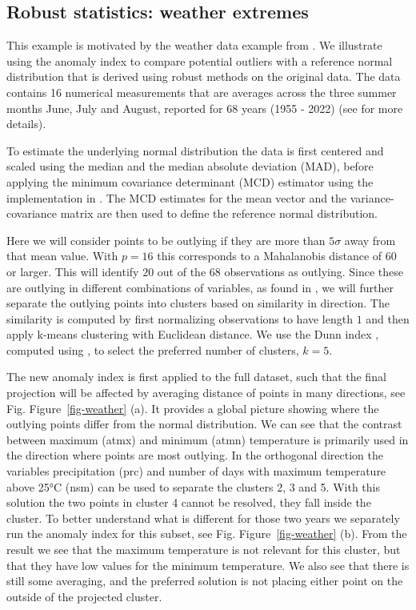 \documentclass[
  12pt]{article}
\begin{document}
\subsection{Robust statistics: weather
extremes}\label{robust-statistics-weather-extremes}

This example is motivated by the weather data example from
\citet{filzmoser2018}. We illustrate using the anomaly index to compare
potential outliers with a reference normal distribution that is derived
using robust methods on the original data. The data contains 16
numerical measurements that are averages across the three summer months
June, July and August, reported for 68 years (1955 - 2022) (see
\citet{filzmoser2018} for more details).

To estimate the underlying normal distribution the data is first
centered and scaled using the median and the median absolute deviation
(MAD), before applying the minimum covariance determinant (MCD)
estimator \citep{rousseeuw1985multivariate} using the implementation in
\citet{robustbase}. The MCD estimates for the mean vector and the
variance-covariance matrix are then used to define the reference normal
distribution.

Here we will consider points to be outlying if they are more than
\(5 \sigma\) away from that mean value. With \(p=16\) this corresponds
to a Mahalanobis distance of \(60\) or larger. This will identify \(20\)
out of the \(68\) observations as outlying. Since these are outlying in
different combinations of variables, as found in \citet{filzmoser2018},
we will further separate the outlying points into clusters based on
similarity in direction. The similarity is computed by first normalizing
observations to have length \(1\) and then apply k-means clustering with
Euclidean distance. We use the Dunn index \citet{dunn}, computed using
\citet{fpc}, to select the preferred number of clusters, \(k=5\).

The new anomaly index is first applied to the full dataset, such that
the final projection will be affected by averaging distance of points in
many directions, see Fig. Figure~\ref{fig-weather} (a). It provides a
global picture showing where the outlying points differ from the normal
distribution. We can see that the contrast between maximum (atmx) and
minimum (atmn) temperature is primarily used in the direction where
points are most outlying. In the orthogonal direction the variables
precipitation (prc) and number of days with maximum temperature above
25°C (nsm) can be used to separate the clusters 2, 3 and 5. With this
solution the two points in cluster 4 cannot be resolved, they fall
inside the cluster. To better understand what is different for those two
years we separately run the anomaly index for this subset, see Fig.
Figure~\ref{fig-weather} (b). From the result we see that the maximum
temperature is not relevant for this cluster, but that they have low
values for the minimum temperature. We also see that there is still some
averaging, and the preferred solution is not placing either point on the
outside of the projected cluster.
\end{document}
